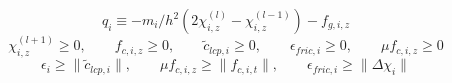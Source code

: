 \documentclass[a4paper,10pt]{article}
\begin{document}
\begin{landscape}
\begin{equation}
q_i \equiv -m_i/h^2(2\chi^{(l)}_{i,z}-\chi^{(l-1)}_{i,z})-f_{g,i,z}
\end{equation}
\begin{equation}
\chi^{(l+1)}_{i,z} \geq 0       , \quad\quad
f_{c,i,z} \geq 0              , \quad\quad
\tilde{c}_{lcp,i} \geq 0          , \quad\quad
\epsilon_{fric,i} \geq 0          , \quad\quad
\mu f_{c,i,z} \geq 0
\end{equation}
\begin{equation}
\epsilon_i            \geq \| \tilde{c}_{lcp,i} \| , \quad\quad
\mu f_{c,i,z}  \geq \| f_{c,i,t}         \| , \quad\quad
\epsilon_{fric,i}    \geq \| \Delta\chi_i      \|
\end{equation}
\end{landscape}

\pagebreak
\end{document}

